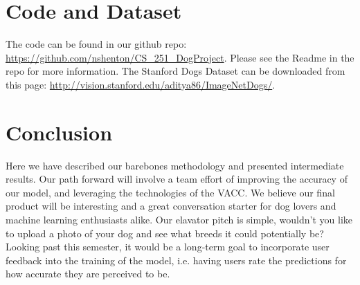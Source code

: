 \documentclass[12pt]{article}
\begin{document}




\section{Code and Dataset}

The code can be found in our github repo: \url{https://github.com/nshenton/CS_251_DogProject}.  Please see the Readme in the repo for more information.  The Stanford Dogs Dataset can be downloaded from this page: \url{http://vision.stanford.edu/aditya86/ImageNetDogs/}.

\section{Conclusion}

Here we have described our barebones methodology and presented intermediate results. Our path forward will involve a team effort of improving the accuracy of our model, and leveraging the technologies of the VACC. We believe our final product will be interesting and a great conversation starter for dog lovers and machine learning enthusiasts alike. Our elavator pitch is simple, wouldn't you like to upload a photo of your dog and see what breeds it could potentially be? Looking past this semester, it would be a long-term goal to incorporate user feedback into the training of the model, i.e. having users rate the predictions for how accurate they are perceived to be. 

\nocite{*}
{}

\end{document}
